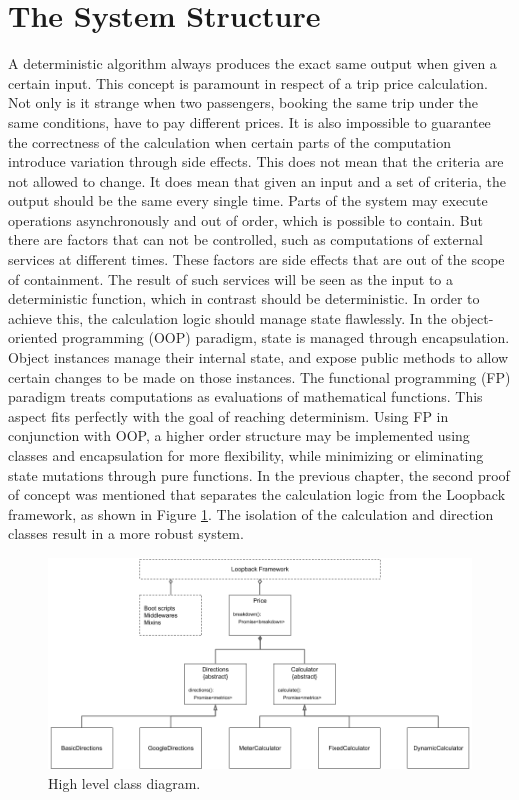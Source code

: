 \section{The System Structure}
A deterministic algorithm always produces the exact same output when given a certain input. This concept is paramount in respect of a trip price calculation. Not only is it strange when two passengers, booking the same trip under the same conditions, have to pay different prices. It is also impossible to guarantee the correctness of the calculation when certain parts of the computation introduce variation through side effects. This does not mean that the criteria are not allowed to change. It does mean that given an input and a set of criteria, the output should be the same every single time. Parts of the system may execute operations asynchronously and out of order, which is possible to contain. But there are factors that can not be controlled, such as computations of external services at different times. These factors are side effects that are out of the scope of containment. The result of such services will be seen as the input to a deterministic function, which in contrast should be deterministic. In order to achieve this, the calculation logic should manage state flawlessly. In the object-oriented programming (OOP) paradigm, state is managed through encapsulation. Object instances manage their internal state, and expose public methods to allow certain changes to be made on those instances. The functional programming (FP) paradigm treats computations as evaluations of mathematical functions. This aspect fits perfectly with the goal of reaching determinism. Using FP in conjunction with OOP, a higher order structure may be implemented using classes and encapsulation for more flexibility, while minimizing or eliminating state mutations through pure functions. In the previous chapter, the second proof of concept was mentioned that separates the calculation logic from the Loopback framework, as shown in Figure \ref{fig:Class Diagram}. The isolation of the calculation and direction classes result in a more robust system.

\begin{figure}[H]
	\centering
	\includegraphics[width=1\textwidth]{ClassDiagram}
	\caption[Class Diagram]{High level class diagram.}
	\label{fig:Class Diagram}
\end{figure}

